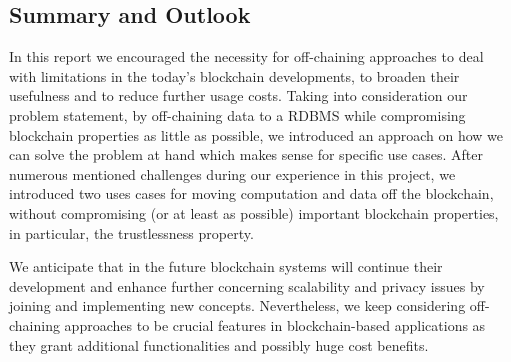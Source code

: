 \subsection{Summary and Outlook}
In this report we encouraged the necessity for off-chaining approaches to deal with limitations in the today’s blockchain developments, to broaden their usefulness and to reduce further usage costs. Taking into consideration our problem statement, by off-chaining data to a RDBMS while compromising blockchain properties as little as possible, we introduced an approach on how we can solve the problem at hand which makes sense for specific use cases. After numerous mentioned challenges during our experience in this project, we introduced two uses cases for moving computation and data off the blockchain, without compromising (or at least as possible) important blockchain properties, in particular, the trustlessness property.

We anticipate that in the future blockchain systems will continue their development and enhance further concerning scalability and privacy issues by joining and implementing new concepts. Nevertheless, we keep considering off-chaining approaches to be crucial features in blockchain-based applications as they grant additional functionalities and possibly huge cost benefits.


\newpage
